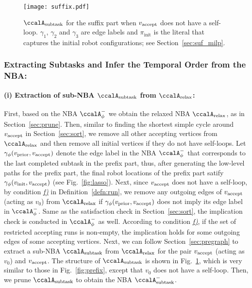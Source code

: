 \documentclass[Afour,sageh,times]{sagej}
\newcommand{\auto}[1]{\ccalA_{\textup{#1}}}
\newcommand{\autop}{\ccalA_{\phi}}
\newcommand{\vertex}[1]{v_{\textup{#1}}}
\begin{document}
{{{  \begin{figure}[!t]
    \centering
    \texttt{[image: suffix.pdf]}
    \caption{$\auto{subtask}$ for the suffix part when $\vertex{accept}$ does not have a self-loop. $\gamma_1$, $\gamma_2$ and $\gamma_3$ are edge labels and $\pi_{\text{init}}$ is the literal that captures the initial robot configurations; see Section~\ref{sec:suf_milp}.}
    \label{fig:suffix}
  \end{figure}

  \subsubsection{Extracting Subtasks and Infer the Temporal Order from the NBA:}\label{sec:suf_prune}
  \paragraph{(i) Extraction of sub-NBA $\auto{subtask}$ from $\auto{relax}$:} First, based on the NBA $\autop^-$ we obtain the relaxed NBA $\auto{relax}$, as in Section~\ref{sec:prune}.  Then, similar to finding the shortest simple cycle around $\vertex{accept}$ in Section~\ref{sec:sort}, we remove all other accepting vertices from $\auto{relax}$ and then remove all initial vertices if they do not have self-loops. Let $\gamma_\phi(\vertex{prior}, \vertex{accept})$ denote the edge label in the NBA $\autop^-$ that corresponds to the last completed subtask in the prefix part, thus, after generating the low-level paths for the prefix part, the final robot locations of the prefix part satify $\gamma_\phi(\vertex{init}, \vertex{accept})$ (see Fig.~\ref{fig:lasso}).  Next, since $\vertex{accept}$ does not have a self-loop, by condition \hyperref[cond:f]{\it f)} in Definition~\ref{defn:run}, we remove any outgoing edges of $\vertex{accept}$ (acting as $v_0$) from $\auto{relax}$ if $\gamma_\phi(\vertex{prior}, \vertex{accept})$ does not imply its edge label in $\autop^-$. Same as the satisfaction check in Section~\ref{sec:sort}, the implication check is conducted in $\autop^-$ as well. According to condition \hyperref[cond:f]{\it f)}, if the set of restricted accepting runs is non-empty, the  implication holds  for some  outgoing edges of some accepting vertices. Next, we can follow Section~\ref{sec:pregraph} to  extract a sub-NBA $\auto{subtask}$ from $\auto{relax}$ for the pair $\vertex{accept}$ (acting as $v_0$) and $\vertex{accept}$. The structure of $\auto{subtask}$ is shown in Fig.~\ref{fig:suffix}, which is very similar to those in Fig.~\ref{fig:prefix}, except that $v_0$ does not have a self-loop.  Then, we prune $\auto{subtask}$ to obtain the NBA $\auto{subtask}^-$.
}}}
\end{document}
